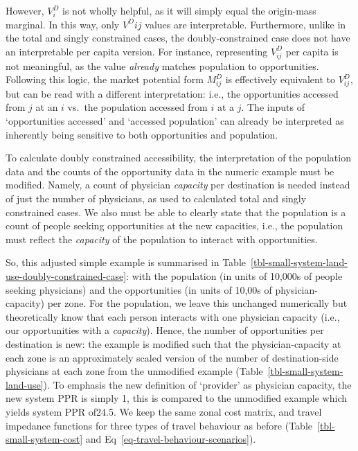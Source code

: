 \documentclass[
  10pt,
  letterpaper,
]{article}
\begin{document}
However, \(V^D_{i}\) is not wholly helpful, as it will simply equal the
origin-mass marginal. In this way, only \(V^D{ij}\) values are
interpretable. Furthermore, unlike in the total and singly constrained
cases, the doubly-constrained case does not have an interpretable per
capita version. For instance, representing \(V_{ij}^D\) per capita is
not meaningful, as the value \emph{already} matches population to
opportunities. Following this logic, the market potential form
\(M^D_{ij}\) is effectively equivalent to \(V_{ij}^D\), but can be read
with a different interpretation: i.e., the opportunities accessed from
\(j\) at an \(i\) vs.~the population accessed from \(i\) at a \(j\). The
inputs of `opportunities accessed' and `accessed population' can already
be interpreted as inherently being sensitive to both opportunities and
population.

To calculate doubly constrained accessibility, the interpretation of the
population data and the counts of the opportunity data in the numeric
example must be modified. Namely, a count of physician \emph{capacity}
per destination is needed instead of just the number of physicians, as
used to calculated total and singly constrained cases. We also must be
able to clearly state that the population is a count of people seeking
opportunities at the new capacities, i.e., the population must reflect
the \emph{capacity} of the population to interact with opportunities.

So, this adjusted simple example is summarised in
Table~\ref{tbl-small-system-land-use-doubly-constrained-case}: with the
population (in units of 10,000s of people seeking physicians) and the
opportunities (in units of 10,00s of physician-capacity) per zone. For
the population, we leave this unchanged numerically but theoretically
know that each person interacts with one physician capacity (i.e., our
opportunities with a \emph{capacity}). Hence, the number of
opportunities per destination is new: the example is modified such that
the physician-capacity at each zone is an approximately scaled version
of the number of destination-side physicians at each zone from the
unmodified example (Table~\ref{tbl-small-system-land-use}). To emphasis
the new definition of `provider' as physician capacity, the new system
PPR is simply 1, this is compared to the unmodified example which yields
system PPR of24.5. We keep the same zonal cost matrix, and travel
impedance functions for three types of travel behaviour as before
(Table~\ref{tbl-small-system-cost} and
Eq~\ref{eq-travel-behaviour-scenarios}).
\end{document}
